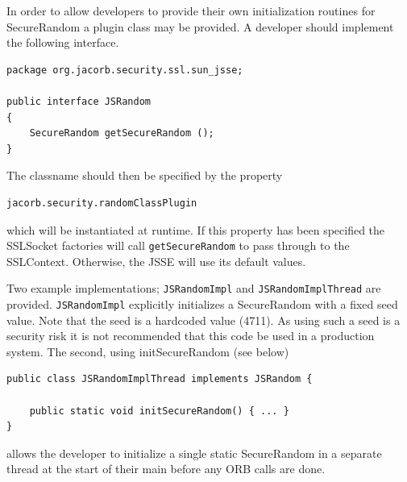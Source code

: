 In order to allow developers to provide their own initialization
routines for SecureRandom a plugin class may be provided. A developer
should implement the following interface.

\begin{small}
\begin{verbatim}
package org.jacorb.security.ssl.sun_jsse;

public interface JSRandom
{
    SecureRandom getSecureRandom ();
}
\end{verbatim}
\end{small}

The classname should then be specified by the property

\begin{verbatim}
jacorb.security.randomClassPlugin
\end{verbatim}
 which will be instantiated at runtime. If this property has been
specified the SSLSocket factories will call {\tt getSecureRandom}
to pass through to the SSLContext. Otherwise, the JSSE will use its
default values.

Two example implementations; {\tt JSRandomImpl} and {\tt JSRandomImplThread}
are provided. {\tt JSRandomImpl} explicitly initializes a SecureRandom with
a fixed seed value. Note that the seed is a hardcoded value (4711). As using
such a seed is a security risk it is not recommended that this code be used
in a production system. The second, using initSecureRandom (see below)

\begin{small}
\begin{verbatim}
public class JSRandomImplThread implements JSRandom {

    public static void initSecureRandom() { ... }
}
\end{verbatim}
\end{small}

allows the developer to initialize a single static SecureRandom
in a separate thread at the start of their main before any ORB
calls are done.


